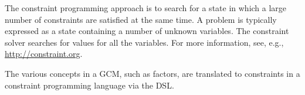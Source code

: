 The constraint programming approach is to search for a state in which
a large number of constraints are satisfied at the same time.
%
A problem is typically expressed as a state containing a number of
unknown variables.
%
The constraint solver searches for values for all the variables.
%
For more information, see, e.g., \url{http://constraint.org}.

The various concepts in a \ac{GCM}, such as factors, are translated 
to constraints in a constraint programming language via the \ac{DSL}. 







